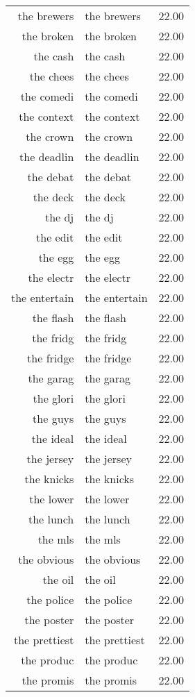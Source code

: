 \begin{table}[ht]
\begin{tabular}{rlr}
  the brewers & the brewers & 22.00 \\ 
  the broken & the broken & 22.00 \\ 
  the cash & the cash & 22.00 \\ 
  the chees & the chees & 22.00 \\ 
  the comedi & the comedi & 22.00 \\ 
  the context & the context & 22.00 \\ 
  the crown & the crown & 22.00 \\ 
  the deadlin & the deadlin & 22.00 \\ 
  the debat & the debat & 22.00 \\ 
  the deck & the deck & 22.00 \\ 
  the dj & the dj & 22.00 \\ 
  the edit & the edit & 22.00 \\ 
  the egg & the egg & 22.00 \\ 
  the electr & the electr & 22.00 \\ 
  the entertain & the entertain & 22.00 \\ 
  the flash & the flash & 22.00 \\ 
  the fridg & the fridg & 22.00 \\ 
  the fridge & the fridge & 22.00 \\ 
  the garag & the garag & 22.00 \\ 
  the glori & the glori & 22.00 \\ 
  the guys & the guys & 22.00 \\ 
  the ideal & the ideal & 22.00 \\ 
  the jersey & the jersey & 22.00 \\ 
  the knicks & the knicks & 22.00 \\ 
  the lower & the lower & 22.00 \\ 
  the lunch & the lunch & 22.00 \\ 
  the mls & the mls & 22.00 \\ 
  the obvious & the obvious & 22.00 \\ 
  the oil & the oil & 22.00 \\ 
  the police & the police & 22.00 \\ 
  the poster & the poster & 22.00 \\ 
  the prettiest & the prettiest & 22.00 \\ 
  the produc & the produc & 22.00 \\ 
  the promis & the promis & 22.00 \\ 

\end{tabular}
\end{table}

